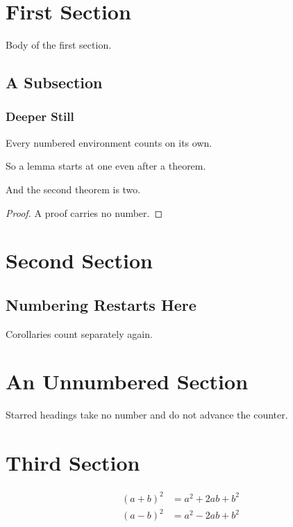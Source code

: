 \section{First Section}
Body of the first section.

\subsection{A Subsection}
\subsubsection{Deeper Still}

\begin{theorem}
Every numbered environment counts on its own.
\end{theorem}

\begin{lemma}
So a lemma starts at one even after a theorem.
\end{lemma}

\begin{theorem}
And the second theorem is two.
\end{theorem}

\begin{proof}
A proof carries no number.
\end{proof}

\section{Second Section}
\subsection{Numbering Restarts Here}

\begin{corollary}
Corollaries count separately again.
\end{corollary}

\section*{An Unnumbered Section}
Starred headings take no number and do not advance the counter.

\section{Third Section}

\begin{align}
(a+b)^2 &= a^2 + 2ab + b^2 \\
(a-b)^2 &= a^2 - 2ab + b^2
\end{align}
